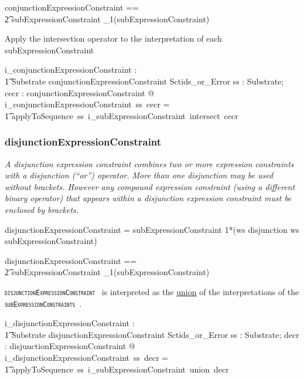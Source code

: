 \documentclass{article}
\def\spec#1{{\tt \small \textsc{{#1}} }}
\def\bnf#1{{\scriptsize {{#1}} }}
\def\desc#1{{\small \textsl{{#1}} }}
\begin{document}
\begin{zed}
conjunctionExpressionConstraint == \\
\t2 subExpressionConstraint \cross \seq_1(subExpressionConstraint)
\end{zed}

Apply the intersection operator to the interpretation of each  subExpressionConstraint

\begin{axdef}
    i\_conjunctionExpressionConstraint : \\
\t1 Substrate \fun conjunctionExpressionConstraint \fun Sctids\_or\_Error
\where
   \forall ss : Substrate;  cecr : conjunctionExpressionConstraint @ \\
i\_conjunctionExpressionConstraint~ss~cecr = \\
\t1 applyToSequence~ss~i\_subExpressionConstraint~intersect~cecr
\end{axdef}

\subsubsection{disjunctionExpressionConstraint}
\begin{framed}
\desc{A disjunction expression constraint combines two or more expression constraints with a disjunction (``or'') operator. More than one disjunction may be used without brackets. However any compound expression constraint (using a different binary operator) that appears within a disjunction expression constraint must be enclosed by brackets.}
\end{framed}

\begin{framed}
\noindent
\bnf{disjunctionExpressionConstraint = subExpressionConstraint 1*(ws disjunction ws subExpressionConstraint)}
\end{framed}

\begin{zed}
disjunctionExpressionConstraint == \\
\t2 subExpressionConstraint \cross \seq_1(subExpressionConstraint)
\end{zed}

\spec{disjunctionExpressionConstraint} is interpreted as the \underline{union} of the interpretations of the
\spec{subExpressionConstraints}.

\begin{axdef}
    i\_disjunctionExpressionConstraint : \\
\t1 Substrate \fun disjunctionExpressionConstraint \fun Sctids\_or\_Error
\where
   \forall ss : Substrate;  decr : disjunctionExpressionConstraint @ \\
i\_disjunctionExpressionConstraint~ss~decr = \\
\t1 applyToSequence~ss~i\_subExpressionConstraint~union~decr
\end{axdef}
\end{document}
